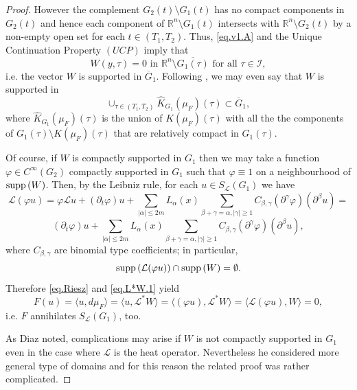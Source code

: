 \documentclass{amsart}
\theoremstyle{definition}
\theoremstyle{remark}
\numberwithin{equation}{section}
\begin{document}
\begin{proof}
However the complement $G_2 (t) \setminus G_1 (t)$ has no compact components in $G_2 (t)$ and 
hence each component of  ${\mathbb R}^{n} \setminus G_1 (t) $ intersects with
 ${\mathbb R}^{n} \setminus  G_2 (t) $ by a non-empty open set for each $t\in (T_1,T_2)$. 
Thus, \eqref{eq.v1.A} and the Unique Continuation Property $(UCP)$ imply that 
\begin{equation*} 
W (y,\tau) = 0   \mbox{ in }{\mathbb R}^{n} \setminus \overline{G_1 (\tau)}
\mbox{ for all } \tau\in \mathcal{I}, 
\end{equation*}
i.e. the vector $W$  is supported in $\overline G_1$. Following \cite{J}, we may even say 
that $W$ is supported in 
$$
\cup_{\tau \in (T_1,T_2) } \hat K_{G_1}(\mu_F) (\tau)
\subset \overline G_1, 
$$  
where $\hat K_{G_1}(\mu_F) (\tau)$ is the union of $K(\mu_F) (\tau)$ with  all the the 
components of $G_1 (\tau)\setminus K(\mu_F) (\tau)$ that are relatively compact in 
$G_1 (\tau)$.

Of course, if $W$ is compactly supported in $G_1$  
then we may take  a function $\varphi \in C^\infty (G_2) $ compactly supported in 
$G_1$ such that $\varphi \equiv 1 $ on a neighbourhood of ${\rm supp} \, (W)$. 
Then, by the Leibniz rule, for each $u \in S_{\mathcal L}(G_1)$ we have 
$$
{\mathcal L} (\varphi u) = \varphi {\mathcal L}  u   + 
(\partial_t \varphi) u  + \sum_{ |\alpha|\leq 2m} L_\alpha (x) 
\sum_{\beta + \gamma =\alpha , |\gamma|\geq 1} C_{\beta,\gamma}
(\partial ^{\gamma} \varphi) (\partial ^{\beta} u) = %
$$
$$
(\partial_t \varphi) u  + \sum_{ |\alpha|\leq 2m} L_\alpha (x) 
\sum_{\beta + \gamma =\alpha , |\gamma|\geq 1} C_{\beta,\gamma}
(\partial ^{\gamma} \varphi) (\partial ^{\beta} u), 
$$
where $C_{\beta,\gamma}$ are binomial type coefficients; in particular,  
$$
{\rm supp} \, ({\mathcal L} (\varphi u)) 
\cap {\rm supp} \, (W)  =\emptyset.
$$ 
Therefore \eqref{eq.Riesz} and \eqref{eq.L*W.1} yield
\begin{equation} \label{eq.supported}
F (u) = \langle u ,d\mu_F  \rangle = \langle  u , {\mathcal L}^* W \rangle =
\langle  (\varphi u) , {\mathcal L}^* W \rangle = \langle  {\mathcal L} (\varphi u) ,  W 
\rangle = 0,
\end{equation} 
i.e. $F$ annihilates $S_{\mathcal L}(G_1)$, too. 

As Diaz \cite[p. 644]{D80} noted, complications may arise if  $W$  is not compactly supported 
in $G_1$  even in the case where ${\mathcal L}$ is the heat operator. Nevertheless  he 
considered more general type of domains and for this reason the related proof was rather 
complicated. 


\end{proof}
\end{document}
